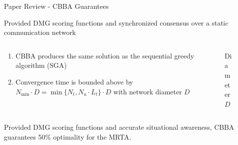 \begin{frame}{Paper Review - CBBA Guarantees}
    \begin{theorem}
        Provided DMG scoring functions and synchronized consensus over a static communication network
        \begin{columns}
        \begin{column}{0.56\textwidth}
        \begin{enumerate}
            \item CBBA produces the same solution as the sequential greedy algorithm (SGA)
            \item Convergence time is bounded above by $N_{\text{min}} \cdot D = \min \{N_t, N_u\cdot L_t\} \cdot D$ with network diameter $D$
        \end{enumerate}
        \end{column}
        \begin{column}{0.35\textwidth}
        \begin{figure}
            \caption{Diameter $D$}
        \end{figure}
        \end{column}
    \end{columns}
    \end{theorem}
    \begin{theorem}
        Provided DMG scoring functions and accurate situational awareness, CBBA guarantees 50\% optimality for the MRTA.
    \end{theorem}
\end{frame}

